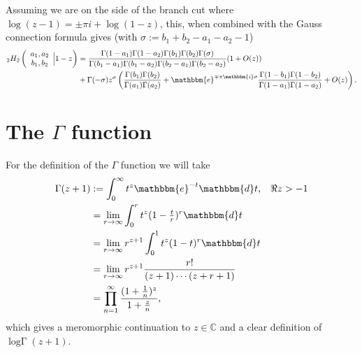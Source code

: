 \documentclass[12pt]{article}
\newcommand{\logG} {\operatorname {log \Gamma}}
\newcommand{\ee}[0] {\mathbbm{e}}
\newcommand{\ii}[0] {\mathbbm{i}}
\newcommand{\dd}[0] {\mathbbm{d}}
\numberwithin{equation}{section}
\newcommand{\FF}[6] {{}_{#1}{#2}_{#3} \left( \begin{array}{c} #4 \\ #5 \end{array} \Big| {#6}  \right)}
\begin{document}
Assuming we are on the side of the branch cut where $\log(z-1) = \pm \pi i + \log(1-z)$, this, when combined with the Gauss connection formula gives (with $\sigma := b_1+b_2-a_1-a_2-1$)
\begin{align*}
\FF{2}{H}{2}{a_1,a_2}{b_1,b_2}{1-z} &= \frac{\Gamma(1-a_1)\Gamma(1-a_2)\Gamma(b_1)\Gamma(b_2)\Gamma(\sigma)}{\Gamma(b_1-a_1)\Gamma(b_1-a_2)\Gamma(b_2-a_1)\Gamma(b_2-a_2)}(1 + O(z))\\
&+ \Gamma(-\sigma) z^{\sigma} \left(\frac{\Gamma(b_1)\Gamma(b_2)}{\Gamma(a_1)\Gamma(a_2)} + \ee^{\mp \pi \ii \sigma} \frac{\Gamma(1-b_1)\Gamma(1-b_2)}{\Gamma(1-a_1)\Gamma(1-a_2)} + O(z)\right)\text{.}
\end{align*}


\section{The $\Gamma$ function}
For the definition of the $\Gamma$ function we will take
\begin{align*}
\Gamma(z+1) &:= \int_0^{\infty} t^z \ee^{-t} \dd t\text{,} \quad \Re z > -1\\
&= \lim_{r \to \infty} \int_0^{r} t^z (1-\tfrac{t}{r})^r \dd t \\
&= \lim_{r \to \infty} r^{z+1} \int_{0}^{1} t^z (1-t)^r \dd t \\
&= \lim_{r \to \infty} r^{z+1} \frac{r!}{(z+1) \cdots (z+r+1)} \\
&= \prod_{n=1} ^{\infty} \frac{(1+\frac{1}{n})^z}{1+\frac{z}{n}}\text{,}
\end{align*}
which gives a meromorphic continuation to $z \in \mathbb{C}$ and a clear definition of $\logG(z+1)$.
\end{document}

